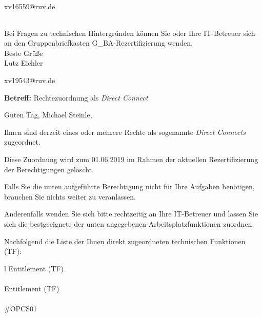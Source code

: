 \documentclass[a4paper,landscape,12pt]{letter}
\begin{document}
\begin{letter}{xv16559@ruv.de\hfill \break}
\begin{tiny}
\begin{longtable}{|p{35mm}|p{15mm}|p{25mm}|p{10mm}|p{40mm}|p{50mm}|p{50mm}|}
\hline
		\end{longtable}
		\end{tiny}
	
\begin{minipage}{\textwidth}
			Bei Fragen zu technischen Hintergründen können Sie 
			oder Ihre IT-Betreuer sich an den Gruppenbriefkasten 
			G\_BA-Rezertifizierung
			wenden.\\
			\linebreak
			Beste Grüße\\
			Lutz Eichler
	\end{minipage}
	\end{letter}
	
\begin{letter}{xv19543@ruv.de\hfill \break}
\begin{normalsize}
	\opening{\textbf{Betreff:} Rechtezuordnung als \emph{Direct Connect}}
	\begin{normalsize} \hfill
	\end{normalsize}

	\begin{normalsize}
		Guten Tag, 
	Michael Steinle, \hfill \break
	\end{normalsize}
	\end{normalsize}
	
\begin{normalsize}
	Ihnen sind derzeit eines oder mehrere Rechte als sogenannte \emph{Direct Connects} zugeordnet.
	
	Diese Zuordnung wird zum 01.06.2019 im Rahmen der aktuellen Rezertifizierung der Berechtigungen gelöscht.
	
	Falls Sie die unten aufgeführte Berechtigung nicht für Ihre Aufgaben benötigen, 
	brauchen Sie nichts weiter zu veranlassen.
	
	Anderenfalls wenden Sie sich bitte rechtzeitig an Ihre IT-Betreuer 
	und lassen Sie sich die bestgeeignete der unten angegebenen Arbeitsplatzfunktionen zuordnen.
	\end{normalsize}
	
\begin{normalsize}
	Nachfolgend die Liste der Ihnen direkt zugeordneten technischen Funktionen (TF):

	\begin{longtable}{l}
		Entitlement (TF) \\ \hline
		\endfirsthead
		\\\hline
		Entitlement (TF) \\ \hline
		\endhead %
		\multicolumn{1}{r@{}}{Fortsetzung \ldots}\\
		\endfoot
		\hline
		\endlastfoot
	\#OPCS01\\
	\end{longtable}
	\end{normalsize}
	

\end{letter}
\end{document}
